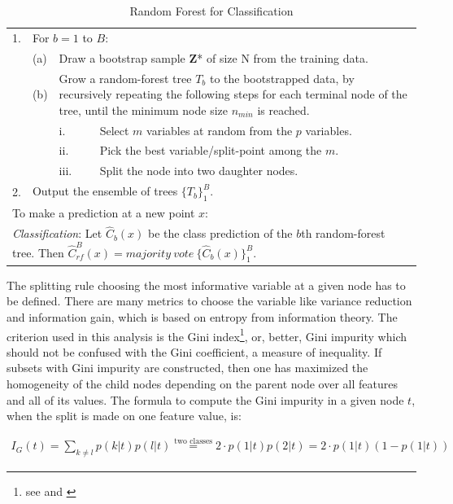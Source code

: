 \documentclass[12pt, a4paper, abstract, parskip]{scrartcl}
\newcommand{\ra}[1]{\renewcommand{\arraystretch}{#1}}
\theoremstyle{definition}
\begin{document}
\begin{table}[!ht]
	\caption{Random Forest for Classification \citep{friedman2009elements}}
	\label{tab:randomforest}
	\centering\ra{1.3}
	\begin{tabular}{@{}llll@{}}\toprule
	1.	& \multicolumn{3}{l}{For $b=1$ to $B$:}\\
		& (a) & \multicolumn{2}{p{13cm}}{Draw a bootstrap sample \textbf{Z}* of size N from the training data.}\\
		& (b) & \multicolumn{2}{p{13cm}}{Grow a random-forest tree $T_b$ to the bootstrapped data, by recursively repeating the following steps for each terminal node of the tree, until the minimum node size $n_{min}$ is reached.}\\
		& & i. & Select $m$ variables at random from the $p$ variables.\\
		& & ii. & Pick the best variable/split-point among the $m$.\\
		& & iii. & Split the node into two daughter nodes.\\
	2.	& \multicolumn{3}{l}{Output the ensemble of trees $\{T_b\}^B_1$.}\\[0.25cm]\midrule
	\multicolumn{4}{l}{To make a prediction at a new point $x$:}\\
	\multicolumn{4}{p{15cm}}{\textit{Classification}: Let $\hat{C}_b(x)$ be the class prediction of the $b$th random-forest tree. Then $\hat{C}^B_{rf}(x) = majority\ vote\ \{\hat{C}_b(x)\}^B_1$.}\\
	\bottomrule
	\end{tabular}
\end{table}

The splitting rule choosing the most informative variable at a given node has
to be defined. There are many metrics to choose the variable like variance
reduction and information gain, which is based on entropy from information
theory. The criterion used in this analysis is the Gini index\footnote{see
\citet[Chapter 9.2]{friedman2009elements} and
\citet{breiman1984classification}}, or, better, Gini impurity which should not
be confused with the Gini coefficient, a measure of inequality. If subsets with
Gini impurity are constructed, then one has maximized the homogeneity of the
child nodes depending on the parent node over all features and all of its
values. The formula to compute the Gini impurity in a given node $t$, when the
split is made on one feature value, is:

\begin{align*}
I_G(t) = \sum_{k\neq l}p(k|t)p(l|t) \overset{\text{two classes}}{=} 2\cdot p(1|t)p(2|t) = 2\cdot p(1|t)(1-p(1|t))
\end{align*}
\end{document}
